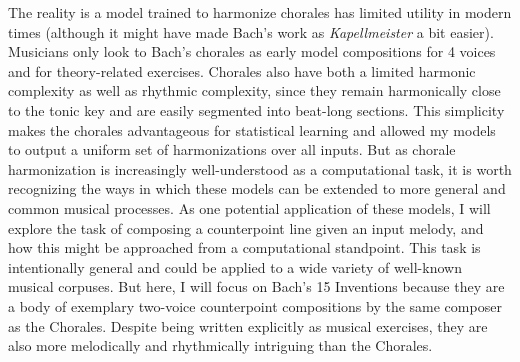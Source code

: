 \documentclass[11pt]{article}
\begin{document}
The reality is a model trained to harmonize chorales has limited utility in modern times (although it might have made Bach's work as \textit{Kapellmeister} a bit easier). Musicians only look to Bach's chorales as early model compositions for 4 voices and for theory-related exercises. Chorales also have both a limited harmonic complexity as well as rhythmic complexity, since they remain harmonically close to the tonic key and are easily segmented into beat-long sections. This simplicity makes the chorales advantageous for statistical learning and allowed my models to output a uniform set of harmonizations over all inputs. But as chorale harmonization is increasingly well-understood as a computational task, it is worth recognizing the ways in which these models can be extended to more general and common musical processes. As one potential application of these models, I will explore the task of composing a counterpoint line given an input melody, and how this might be approached from a computational standpoint. This task is intentionally general and could be applied to a wide variety of well-known musical corpuses. But here, I will focus on Bach's 15 Inventions because they are a body of exemplary two-voice counterpoint compositions by the same composer as the Chorales. Despite being written explicitly as musical exercises, they are also more melodically and rhythmically intriguing than the Chorales.
\end{document}
